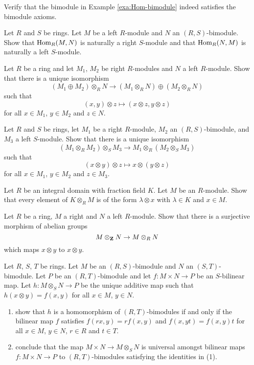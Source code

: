 \begin{exercise}Verify that the bimodule in Example \ref{exa:Hom-bimodule} indeed satisfies the bimodule axioms.
\end{exercise}

\begin{exercise}\label{exc:hom-bimodule}
Let $R$ and $S$ be rings. Let $M$ be a left $R$-module and $N$ an $(R,S)$-bimodule. Show that $\operatorname{Hom}_R(M,N)$ is naturally a right $S$-module and that $\operatorname{Hom}_R(N,M)$ is naturally a left $S$-module.
\end{exercise}


\begin{exercise}
Let $R$ be a ring and let $M_1$, $M_2$ be right $R$-modules and $N$ a left $R$-module. Show that there is a unique isomorphism
\[
	 (M_1\oplus M_2) \otimes_R N \to (M_1\otimes_R N) \oplus (M_2 \otimes_R N)
\]
such that 
\[
	(x,y)\otimes z \mapsto (x\otimes z, y\otimes z)
\]
for all $x\in M_1$, $y\in M_2$ and $z\in N$.
\end{exercise}


\begin{exercise}
Let $R$ and $S$ be rings, let $M_1$ be a right $R$-module, $M_2$ an $(R,S)$-bimodule, and $M_3$ a left $S$-module. Show that there is a unique isomorphism
\[
	 (M_1\otimes_R M_2) \otimes_S M_3 \to M_1 \otimes_R (M_2 \otimes_S M_3)
\]
such that 
\[
	(x\otimes y)\otimes z \mapsto x\otimes(y\otimes z)
\]
for all $x\in M_1$, $y\in M_2$ and $z\in M_3$.
\end{exercise}



\begin{exercise}
Let $R$ be an integral domain with fraction field $K$. Let $M$  be an $R$-module. Show that every element of $K\otimes_R M$ is of the form $\lambda\otimes x$ with $\lambda \in K$ and $x\in M$.
\end{exercise}


\begin{exercise}
Let $R$ be a ring, $M$ a right and $N$ a left $R$-module. Show that there is a surjective morphism of 
abelian groups
\[
	M\otimes_{\mathbf{Z}} N \to M\otimes_R N
\]
which maps $x\otimes y$ to $x\otimes y$. 
\end{exercise}

\begin{exercise}
Let $R$, $S$, $T$ be rings. Let $M$ be an $(R,S)$-bimodule and $N$ an $(S,T)$-bimodule. Let $P$ be an $(R,T)$-bimodule and let $f\colon M\times N\to P$ be an $S$-bilinear map. Let $h\colon M\otimes_S N \to P$ be the unique additive map such that $h(x\otimes y)=f(x,y)$ for all $x\in M$, $y\in N$. 
\begin{enumerate}
\item show that $h$ is a homomorphism of $(R,T)$-bimodules if and only if the bilinear map $f$ satisfies $f(rx,y) = rf(x,y)$ and $f(x,yt) = f(x,y)t$ for all $x\in M$, $y\in N$, $r\in R$ and $t \in T$. 
\item conclude that the map $M\times N \to M\otimes_S N$ is universal amongst bilinear maps $f\colon M\times N \to P$ to $(R,T)$-bimodules satisfying the identities in (1). 
\end{enumerate}
\end{exercise}


